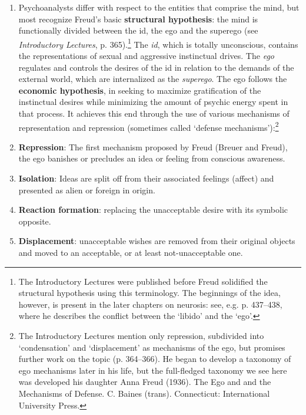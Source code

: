 \begin{enumerate}
\item Psychoanalysts differ with respect to the entities that comprise the mind, but most recognize Freud's basic \textbf{structural hypothesis}: the mind is functionally divided between the id, the ego and the superego (see \emph{Introductory Lectures}, p. 365).\footnote{The Introductory Lectures were published before Freud solidified the structural hypothesis using this terminology. The beginnings of the idea, however, is present in the later chapters on neurosis: see, e.g. p. 437--438, where he describes the conflict between the `libido' and the `ego'.} The \emph{id}, which is totally unconscious, contains the representations of sexual and aggressive instinctual drives. The \emph{ego} regulates and controls the desires of the id in relation to the demands of the external world, which are internalized as the \emph{superego}. The ego follows the \textbf{economic hypothesis}, in seeking to maximize gratification of the instinctual desires while minimizing the amount of psychic energy spent in that process. It achieves this end through the use of various mechanisms of representation and repression (sometimes called `defense mechanisms'):\footnote{The Introductory Lectures mention only repression, subdivided into `condensation' and `displacement' as mechanisms of the ego, but promises further work on the topic (p. 364--366). He began to develop a taxonomy of ego mechanisms later in his life, but the full-fledged taxonomy we see here was developed his daughter Anna Freud (1936). The Ego and and the Mechanisms of Defense. C. Baines (trans). Connecticut: International University Press.}

\item \textbf{Repression}: The first mechanism proposed by Freud (Breuer and Freud), the ego banishes or precludes an idea or feeling from conscious awareness.

\item \textbf{Isolation}: Ideas are split off from their associated feelings (affect) and presented as alien or foreign in origin.

\item \textbf{Reaction formation}: replacing the unacceptable desire with its symbolic opposite.

\item \textbf{Displacement}: unacceptable wishes are removed from their original objects and moved to an acceptable, or at least not-unacceptable one.


\end{enumerate}
